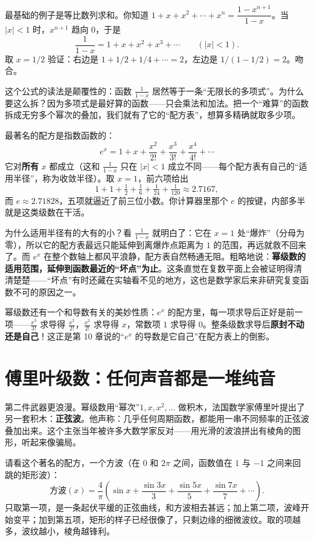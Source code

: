 最基础的例子是等比数列求和。你知道 $1+x+x^2+\cdots+x^n=\dfrac{1-x^{n+1}}{1-x}$。当 $|x|<1$ 时，$x^{n+1}$ 趋向 $0$，于是
\[
\frac{1}{1-x}=1+x+x^2+x^3+\cdots \qquad(|x|<1).
\]
取 $x=1/2$ 验证：右边是 $1+1/2+1/4+\cdots=2$，左边是 $1/(1-1/2)=2$。吻合。

这个公式的读法是颠覆性的：函数 $\frac{1}{1-x}$ 居然等于一条“无限长的多项式”。为什么要这么拆？因为多项式是最好算的函数——只会乘法和加法。把一个“难算”的函数拆成无穷多个幂次的叠加，我们就有了它的“配方表”，想算多精确就取多少项。

最著名的配方是指数函数的：
\[
e^x=1+x+\frac{x^2}{2!}+\frac{x^3}{3!}+\frac{x^4}{4!}+\cdots
\]
它对\textbf{所有} $x$ 都成立（这和 $\frac{1}{1-x}$ 只在 $|x|<1$ 成立不同——每个配方表有自己的“适用半径”，称为收敛半径）。取 $x=1$，前六项给出
\[
1+1+\tfrac12+\tfrac16+\tfrac1{24}+\tfrac1{120}\approx 2.7167,
\]
而 $e\approx 2.71828$，五项就逼近了前三位小数。你计算器里那个 $e$ 的按键，内部多半就是这类级数在干活。

为什么适用半径有的大有的小？看 $\frac{1}{1-x}$ 就明白了：它在 $x=1$ 处“爆炸”（分母为零），所以它的配方表最远只能延伸到离爆炸点距离为 $1$ 的范围，再远就救不回来了。而 $e^x$ 在整个数轴上都风平浪静，配方表自然畅通无阻。粗略地说：\textbf{幂级数的适用范围，延伸到函数最近的“坏点”为止}。这条直觉在复数平面上会被证明得清清楚楚——“坏点”有时还藏在实轴看不见的地方，这也是数学家后来非研究复变函数不可的原因之一。

幂级数还有一个和导数有关的美妙性质：$e^x$ 的配方里，每一项求导后正好是前一项——$\frac{x^3}{3!}$ 求导得 $\frac{x^2}{2!}$，$\frac{x^2}{2!}$ 求导得 $x$，常数项 $1$ 求导得 $0$。整条级数求导后\textbf{原封不动还是自己}！这正是第 10 章说的“$e^x$ 的导数是它自己”在配方表上的倒影。

\section{傅里叶级数：任何声音都是一堆纯音}

第二件武器更浪漫。幂级数用“幂次”$1,x,x^2,\dots$ 做积木，法国数学家傅里叶提出了另一套积木：\textbf{正弦波}。他声称：几乎任何周期函数，都能用一串不同频率的正弦波叠加出来。这个主张当年被许多大数学家反对——用光滑的波浪拼出有棱角的图形，听起来像骗局。

请看这个著名的配方，一个方波（在 $0$ 和 $2\pi$ 之间，函数值在 $1$ 与 $-1$ 之间来回跳的矩形波）：
\[
\text{方波}(x)=\frac{4}{\pi}\left(\sin x+\frac{\sin 3x}{3}+\frac{\sin 5x}{5}+\frac{\sin 7x}{7}+\cdots\right).
\]
只取第一项，是一条起伏平缓的正弦曲线，和方波相去甚远；加上第二项，波峰开始变平；加到第五项，矩形的样子已经很像了，只剩边缘的细微波纹。取的项越多，波纹越小，棱角越锋利。

